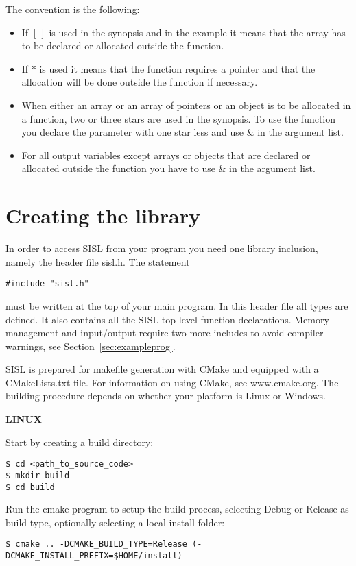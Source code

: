 The convention is the following:
\begin{itemize}
\item If $[\,]$ is used in the synopsis and in the example it means
that the array has to be declared or allocated outside the function.
\item If $*$ is used it means that the function requires a
pointer and that the allocation will be done outside the function if necessary.
\item When either an array or an array of pointers or an object is to be
allocated in a function, two or three stars are used in the
synopsis.
To use the function you declare the parameter with one star less and use  \&
in the argument list.
\item For all output variables except arrays or objects
that are declared or allocated  outside the function you have to use \&
in the argument list.
\end{itemize}


\vfill
\newpage
\vfill
\newpage
\section{Creating the library}

In order to access SISL from your program you need one library inclusion, namely
the header file sisl.h. The statement
\begin{verbatim}
#include "sisl.h"
\end{verbatim}
must be written at the top of your main program.
In this header file all types
are defined.
It also contains all the
SISL top level function declarations.
Memory management and input/output require two more includes to avoid compiler warnings,
see Section~\ref{sec:exampleprog}.

SISL is prepared for makefile generation with CMake and equipped with a CMakeLists.txt file.
For information on using CMake, see www.cmake.org. The building procedure depends on whether your platform is
Linux or Windows.

\medskip
    {\noindent \bf LINUX}

Start by creating a build directory:
\begin{verbatim}
$ cd <path_to_source_code>
$ mkdir build
$ cd build
\end{verbatim}

Run the cmake program to setup the build process, selecting Debug or Release
as build type, optionally selecting a local install folder:
\begin{verbatim}
$ cmake .. -DCMAKE_BUILD_TYPE=Release (-DCMAKE_INSTALL_PREFIX=$HOME/install)
\end{verbatim}

